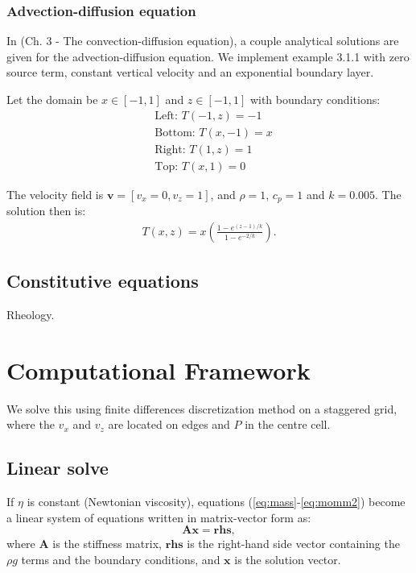 \documentclass[a4paper,11pt]{article}
\begin{document}
\subsubsection{Advection-diffusion equation} \label{advdiff}
In \citet{Elman2005} (Ch. 3 - The convection-diffusion equation), a couple analytical solutions are given for the advection-diffusion equation. We implement example 3.1.1 with zero source term, constant vertical velocity and an exponential boundary layer.

Let the domain be $x\in [-1,1]$ and $z\in [-1,1]$ with boundary conditions:
\begin{align}
&\text{Left: } T(-1,z) = -1 \\
&\text{Bottom: } T(x,-1) = x\\
&\text{Right: } T(1,z) = 1\\
&\text{Top: } T(x,1) = 0
\end{align}

The velocity field is $\textbf{v} = [v_x=0, v_z=1]$, and $\rho=1$, $c_p=1$ and $k=0.005$. The solution then is:
\begin{align}
T(x,z) = x\left(\frac{1-e^{(z-1)/k}}{1-e^{-2/k}}\right).
\end{align}

\subsection{Constitutive equations}
Rheology. 

\section{Computational Framework}

We solve this using finite differences discretization method on a staggered grid, where the $v_x$ and $v_z$ are located on edges and $P$ in the centre cell.

\subsection{Linear solve}
If $\eta$ is constant (Newtonian viscosity), equations (\ref{eq:mass}-\ref{eq:momm2}) become a linear system of equations written in matrix-vector form as:
\begin{equation}
\textbf{A} \textbf{x} = \textbf{rhs},
\end{equation}
where $\textbf{A}$ is the stiffness matrix, $\textbf{rhs}$ is the right-hand side vector containing the $\rho g$ terms and the boundary conditions, and $\textbf{x} $ is the solution vector. 
\end{document}
